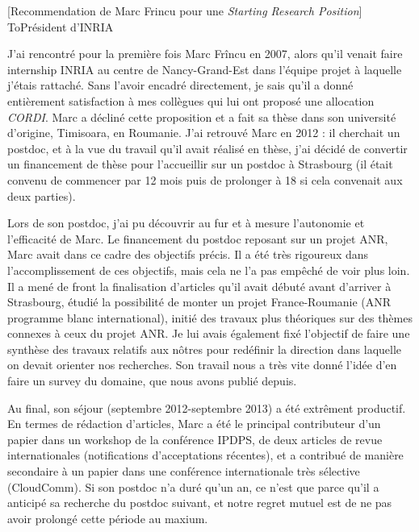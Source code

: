 \documentclass[a4paper,10pt]{article}
\begin{document}

\begin{letter}[Recommendation de Marc Frincu pour une \emph{Starting Research Position}]%
{To}{Président d'INRIA}
 

J'ai rencontré pour  la première fois Marc Fr\^incu en  2007, alors qu'il venait
faire  internship INRIA  au centre  de  Nancy-Grand-Est dans  l'équipe projet  à
laquelle j'étais  rattaché. Sans  l'avoir encadré directement,  je sais  qu'il a
donné  entièrement  satisfaction  à  mes  collègues  qui  lui  ont  proposé  une
allocation \emph{CORDI}.   Marc a décliné cette  proposition et a fait  sa thèse
dans son  université d'origine, Timisoara,  en Roumanie.  J'ai retrouvé  Marc en
2012 : il  cherchait un postdoc, et à  la vue du travail qu'il  avait réalisé en
thèse, j'ai décidé de convertir un financement de thèse pour l'accueillir sur un
postdoc  à  Strasbourg (il  était  convenu  de commencer  par  12  mois puis  de
prolonger à 18 si cela convenait aux deux parties).

Lors  de son  postdoc, j'ai  pu  découvrir au  fur  et à  mesure l'autonomie  et
l'efficacité de Marc. Le financement du postdoc reposant sur un projet ANR, Marc
avait  dans  ce cadre  des  objectifs  précis.  Il  a  été  très rigoureux  dans
l'accomplissement de  ces objectifs, mais cela  ne l'a pas empêché  de voir plus
loin. Il  a mené de  front la finalisation  d'articles qu'il avait  débuté avant
d'arriver   à  Strasbourg,   étudié   la  possibilité   de   monter  un   projet
France-Roumanie  (ANR programme  blanc international),  initié des  travaux plus
théoriques sur des thèmes connexes à ceux  du projet ANR. Je lui avais également
fixé  l'objectif de  faire une  synthèse des  travaux relatifs  aux nôtres  pour
redéfinir  la direction  dans laquelle  on devait  orienter nos  recherches. Son
travail nous a très vite donné l'idée  d'en faire un survey du domaine, que nous
avons publié depuis.

 
Au final, son séjour (septembre  2012-septembre 2013) a été extrêment productif.
En termes  de rédaction d'articles,  Marc a  été le principal  contributeur d'un
papier  dans un  workshop de  la  conférence IPDPS,  de deux  articles de  revue
internationales  (notifications  d'acceptations  récentes), et  a  contribué  de
manière secondaire à un papier dans une conférence internationale très sélective
(CloudComm). Si son postdoc n'a duré qu'un an, ce n'est que parce qu'il a
anticipé sa recherche du postdoc suivant, et notre regret mutuel est de ne pas
avoir prolongé cette période au maxium.



\end{letter}
\end{document}
